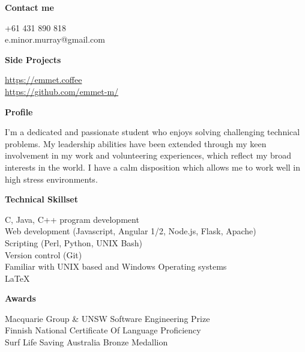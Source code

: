 \documentclass{article}
\newcommand{\mytitle}[1]{{\Large\textbf{#1}} \vspace{0.2cm}}
\begin{document}
\begin{minipage}[t]{0.3\linewidth}
    \vspace{0.2cm}
    {
        \mytitle{Contact me}
        
        +61 431 890 818 \\
        e.minor.murray@gmail.com \\

    }
    \vspace{0.2cm}
    {
        \mytitle{Side Projects}
        
        \href{https://emmet.coffee}{https://emmet.coffee} \\
        \href{https://github.com/emmet-m/}{https://github.com/emmet-m/} \\
        
    }
    \vspace{0.3cm}
    {
        \mytitle{Profile}
        
        I'm a dedicated and passionate student who enjoys solving challenging technical problems.
        My leadership abilities have been extended through my keen involvement in my work and volunteering experiences, which reflect my broad interests in the world.
        I have a calm disposition which allows me to work well in high stress environments. \\
    }
    \vspace{0.3cm}
    
    {
        \mytitle{Technical Skillset}

        C, Java, C++ program development \\ 

        Web development (Javascript, Angular 1/2, Node.js, Flask, Apache) \\

        Scripting (Perl, Python, UNIX Bash) \\

        Version control (Git) \\

        Familiar with UNIX based and Windows Operating systems \\

        {\large \LaTeX}
    }

    \vspace{0.5cm}

    {
        \mytitle{Awards}

        Macquarie Group \& UNSW Software Engineering Prize \\

        Finnish National Certificate Of Language Proficiency \\

        Surf Life Saving Australia Bronze Medallion
    }
%
%
\end{minipage}
%
\end{document}
